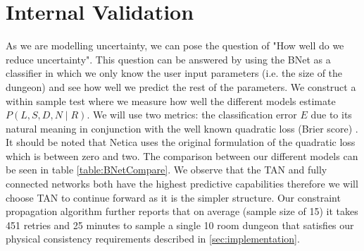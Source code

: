 \documentclass{UoYCSproject}
\begin{document}
\section{Internal Validation}
As we are modelling uncertainty, we can pose the question of "How well do we reduce uncertainty". This question can be answered by using the BNet as a classifier in which we only know the user input parameters (i.e. the size of the dungeon) and see how well we predict the rest of the parameters. We construct a within sample test where we measure how well the different models estimate \(P(L,S,D,N\mid R)\). We will use two metrics: the classification error \(E\) due to its natural meaning in conjunction with the well known quadratic loss (Brier score) \parencite{PearlScoringRules}. It should be noted that Netica uses the original formulation of the quadratic loss which is between zero and two. The comparison between our different models can be seen in table \ref{table:BNetCompare}. We observe that the TAN and fully connected networks both have the highest predictive capabilities therefore we will choose TAN to continue forward as it is the simpler structure. Our constraint propagation algorithm further reports that on average (sample size of 15) it takes 451 retries and 25 minutes to sample a single 10 room dungeon that satisfies our physical consistency requirements described in \ref{sec:implementation}.
\end{document}
